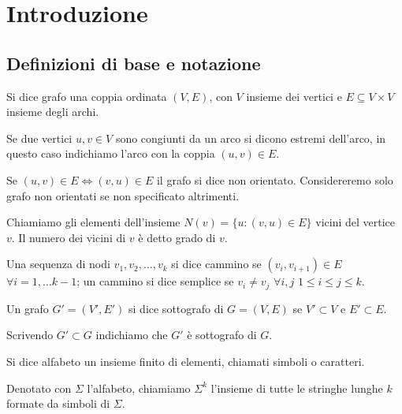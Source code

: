 


\chapter{Introduzione}

\section{Definizioni di base e notazione}

\begin{definizione}\label{def:grafo}
	Si dice grafo una coppia ordinata $(V, E)$, con $V$ insieme dei vertici e $E \subseteq V \times V$ insieme degli archi.
\end{definizione}
	
	Se due vertici $u, v \in V$ sono congiunti da un arco si dicono estremi dell'arco, in questo caso indichiamo l'arco con la coppia $(u, v) \in E$.
	
	Se $(u,v) \in E \Leftrightarrow (v,u) \in E$ il grafo si dice non orientato. Considereremo solo grafo non orientati se non specificato altrimenti.
	
	Chiamiamo gli elementi dell'insieme $N(v) = \{ u : (v,u) \in E \}$ vicini del vertice $v$. Il numero dei vicini di $v$ è detto grado di $v$.
	
	Una sequenza di nodi $v_{1}, v_{2}, \ldots, v_{k}$ si dice cammino se $(v_{i}, v_{i+1}) \in E$ $\forall i = 1, \ldots k-1$; un cammino si dice semplice se $v_{i} \neq v_{j}$ $\forall i,j$ $1 \leq i \le j \leq k$.

\begin{definizione}\label{def:sottografo}
	Un grafo $G' = (V', E')$ si dice sottografo di $G = (V, E)$ se $V' \subset V$ e $E' \subset E$.
\end{definizione}
	
	Scrivendo $G' \subset G$ indichiamo che $G'$ è sottografo di $G$.
	
\begin{definizione}\label{def:alfabeto}
	Si dice alfabeto un insieme finito di elementi, chiamati simboli o caratteri.
\end{definizione}
	
	Denotato con $\Sigma$ l'alfabeto, chiamiamo $\Sigma^{k}$ l'insieme di tutte le stringhe lunghe $k$ formate da simboli di $\Sigma$.
	
